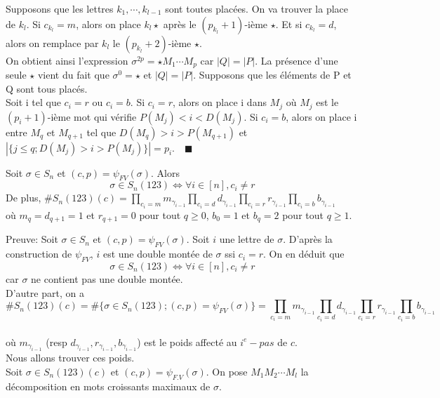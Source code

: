 Supposons que les lettres $k_{1},\cdots, k_{l-1} $ sont toutes placées. On va trouver la place de $k_{l}$.
Si $c_{k_{l}} = m$, alors on place $k_{l}\star$ après le $(p_{k_{l}}+1)$-ième $\star$. Et si $c_{k_{l}}=d$, alors on
remplace par $k_{l}$ le $(p_{k_{l}}+2)$-ième $\star$.\\
On obtient ainsi l'expression $\sigma^{2p} = \star M_{1}\cdots M_{p} $ car $|Q| = |P|$. La présence d'une seule $\star$
vient du fait que $\sigma^0 = \star$ et $|Q| = |P|$. Supposons que les éléments de P et Q sont tous placés.\\ Soit i
tel que $c_{i}=r \text{ ou } c_{i}=b$. Si $c_{i}=r$, alors on place i dans $M_{j}$ où $M_{j}$ est le $(p_{i}+1)$-ième
mot qui vérifie $P(M_{j}) < i < D(M_{j})$.
Si $c_{i}=b$, alors on place i entre $M_{q}$ et $M_{q+1}$ tel que $D(M_{q})>i>P(M_{q+1}) $ et $|\{j\leq q;
	D(M_{j})>i>P(M_{j})\}| = p_{i} $. $\text{ } \blacksquare$\\
\begin{lemme}\label{noRedPath123}
	Soit $\sigma \in S_{n}$ et $(c, p) = \psi_{FV}(\sigma)$. Alors $$ \sigma \in S_{n}(123) \iff \forall i \in [n], c_{i}\neq r$$
	De plus, $\#S_{n}(123)(c) = \prod\limits_{c_{i}=m}m_{\gamma_{i-1}} \prod\limits_{c_{i}=d}d_{\gamma_{i-1}} \prod\limits_{c_{i}=r}r_{\gamma_{i-1}} \prod\limits_{c_{i}=b}b_{\gamma_{i-1}}$\\
	où $m_{q}=d_{q+1}=1$ et $r_{q+1}=0$ pour tout $q\geq 0$, $b_{0}=1$ et $b_{q}=2$ pour tout $q\geq 1$.
\end{lemme}
Preuve: Soit $\sigma \in S_{n}$ et $(c,p) = \psi_{FV}(\sigma)$. Soit $i$ une lettre de $\sigma$. D'après la construction de $\psi_{FV}$, $i$ est une double montée de $\sigma$ ssi $c_{i}=r$. On en déduit que $$\sigma \in S_{n}(123) \iff \forall i \in [n], c_{i}\neq r$$ car $\sigma$ ne contient pas une double montée.\vspace{10pt}\\
D'autre part, on a $$\#S_{n}(123)(c) = \#\{\sigma \in S_{n}(123); (c, p)=\psi_{FV}(\sigma)\}= \prod\limits_{c_{i}=m}m_{\gamma_{i-1}} \prod\limits_{c_{i}=d}d_{\gamma_{i-1}} \prod\limits_{c_{i}=r}r_{\gamma_{i-1}} \prod\limits_{c_{i}=b}b_{\gamma_{i-1}}$$\\
où $m_{\gamma_{i-1}}$ (resp $d_{\gamma_{i-1}}, r_{\gamma_{i-1}}, b_{\gamma_{i-1}}$) est le poids affecté au $i^{e}-pas $ de $c$.\vspace{5pt}\\
Nous allons trouver ces poids.\\
Soit $\sigma \in S_{n}(123)(c)$ et $(c, p)=\psi_{F.V}(\sigma)$. On pose $M_{1}M_{2} \cdots M_{l}$ la décomposition en mots croissants maximaux de $\sigma$.\vspace{5pt}\\

